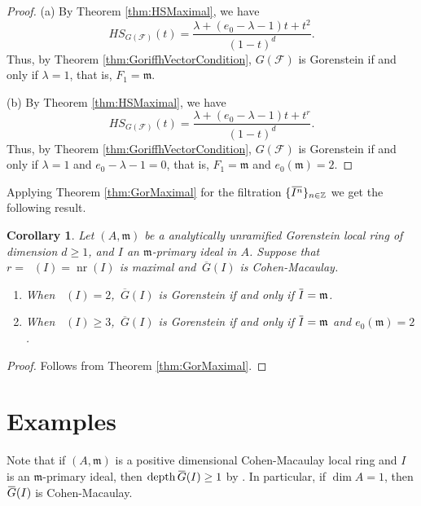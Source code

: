 \documentclass[12pt]{amsart}
\newtheorem{cor}[thm]{Corollary}
\theoremstyle{definition}
\theoremstyle{remark}
\numberwithin{equation}{section}
\newcommand{\m}{{\mathfrak m}}
\DeclareMathOperator{\depth}{depth}
\DeclareMathOperator{\nr}{{nr}}
\DeclareMathOperator{\br}{\bar r}
\newcommand{\FF}{\mathcal{F}}
\newcommand{\ol}[1]{\mkern 1.5mu\overline{\mkern-1.5mu#1\mkern-1.5mu}\mkern 1.5mu} %
\newcommand{\olsi}[1]{\,\overline{\!{#1}}} %
\begin{document}
\begin{proof}
(a) By Theorem \ref{thm:HSMaximal}, 
we have 
\[
HS_{G(\FF)}(t)=\dfrac{\lambda+(e_0-\lambda-1)t+t^2}{(1-t)^d}.
\]    
Thus, by Theorem \ref{thm:GoriffhVectorCondition}, 
$G(\FF)$ is Gorenstein if and only if  $\lambda=1$, that is, 
$F_1=\m$. 
\par \vspace{2mm}
(b) By Theorem \ref{thm:HSMaximal}, 
we have 
\[
HS_{G(\FF)}(t)=\dfrac{\lambda+(e_0-\lambda-1)t+t^r}{(1-t)^d}.
\]    
Thus, by Theorem \ref{thm:GoriffhVectorCondition},  
$G(\FF)$ is Gorenstein if and only if  $\lambda=1$ and $e_0-\lambda-1=0$, that is, 
$F_1=\m$ and $e_0(\m)=2$.
\end{proof}

Applying Theorem \ref{thm:GorMaximal} 
for the filtration $\{\ol{I^n}\}_{n \in \mathbb{Z}}$ 
we get the following result.

\begin{cor} \label{cor:Maximal_normal}
Let $(A, \m) $ be a analytically unramified Gorenstein local ring of dimension $d \ge 1$, and $I$ an $\m$-primary ideal in $A$. 
Suppose that $r=\br(I)=\nr(I)$ is maximal and $\olsi{G}(I)$ is Cohen-Macaulay. 
\begin{enumerate}
\item[\rm{(a)}] When $\br(I)=2$,  
$\olsi{G}(I)$ is Gorenstein if and only if $\ol{I} = \m$. 
\item[\rm{(b)}] When $\br(I) \ge 3$,  
$\olsi{G}(I)$ is Gorenstein if and only if $\ol{I} = \m$ and ${e_0}(\m) = 2$.
\end{enumerate}
\end{cor}

\begin{proof}
    Follows from Theorem \ref{thm:GorMaximal}.
\end{proof}


\section{Examples} \label{sec:Examples}

Note that if $(A, \m)$ is a positive dimensional Cohen-Macaulay local ring and $I$ is an $\m$-primary ideal, then $\depth \ol{G}(I) \geq 1$ by \cite[Proposition 3.25]{Mar89}. In particular, if $\dim A = 1$, then $\ol{G}(I)$  is Cohen-Macaulay.
\end{document}
